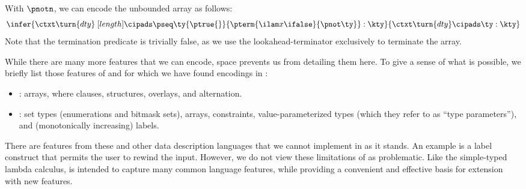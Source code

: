With $\pnotn$, we can encode the unbounded \datascript{} array as
follows:
\[
  \infer{
    \ctxt \turn {dty} \; [{length}] \cipads 
    \pseq \ty {\ptrue{}} {\pterm {\ilam x {} \ifalse} {\pnot \ty}} : \kty
  }{ 
    \ctxt \turn {dty} \cipads \ty : \kty 
  }
\]
Note that the termination predicate is trivially false, as we use the
lookahead-terminator exclusively to terminate the array.

While there are many more features that we can encode, space prevents us from
detailing them here. To give a sense of what is possible, we
briefly list those features of \datascript{} and \packettypes{} for
which we have found encodings in \ddc{}:
\begin{itemize}
\item \packettypes{}: arrays, where clauses, structures, overlays,
  and alternation.
\item \datascript{}: set types (enumerations and bitmask sets),
  arrays, constraints, value-parameterized types (which they refer to
  as ``type parameters''), and (monotonically increasing) labels.
\end{itemize}

There are features from these and other data description languages
that we cannot implement in \ddc{} as it stands.  An example is a label construct that permits the user to rewind the input. However, we do not view these limitations of
\ddc{} as problematic. Like the simple-typed lambda calculus, \ddc{}
is intended to capture many common language features, while providing
a convenient and effective basis for extension with new features.


